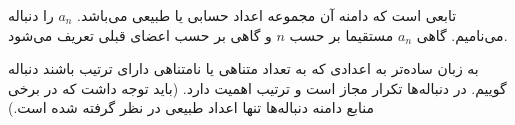 \begin{definition}
تابعی است که دامنه آن مجموعه اعداد حسابی یا طبیعی می‌باشد.
\p
$a_n$
را 
 دنباله می‌نامیم. گاهی
$a_n$
مستقیما بر حسب
$n$
 و گاهی بر حسب اعضای قبلی تعریف می‌شود.
\end{definition}
\p
به زبان ساده‌تر به اعدادی که به تعداد متناهی یا نامتناهی دارای ترتیب باشند دنباله گوییم. در دنباله‌ها تکرار مجاز است و ترتیب اهمیت دارد.
(باید توجه داشت که در برخی منابع دامنه دنباله‌ها تنها اعداد طبیعی در نظر گرفته شده است.)



